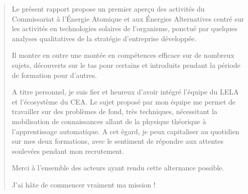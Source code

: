 \renewcommand{\abstractname}{Conclusion}

\begin{abstract}

    Le présent rapport propose un premier aperçu des activités du Commissariat à l'Énergie Atomique et aux Énergies Alternatives centré sur les activités en technologies solaires de l'organisme, ponctué par quelques analyses qualitatives de la stratégie d'entreprise développée.

    Il montre en outre une montée en compétences efficace sur de nombreux sujets, découverts sur le tas pour certains et introduits pendant la période de formation pour d'autres.

    A titre personnel, je suis fier et heureux d'avoir intégré l'équipe du \gls{LELA} et l'écosystème du \gls{CEA}.
    Le sujet proposé par mon équipe me permet de travailler sur des problèmes de fond, très techniques, nécessitant la mobilisation de connaissances allant de la physique théorique à l'apprentissage automatique.
    A cet égard, je peux capitaliser au quotidien sur mes deux formations, avec le sentiment de répondre aux attentes soulevées pendant mon recrutement.

    Merci à l'ensemble des acteurs ayant rendu cette alternance possible.
    \begin{center}
        J'ai hâte de commencer vraiment ma mission !
    \end{center}

\end{abstract}